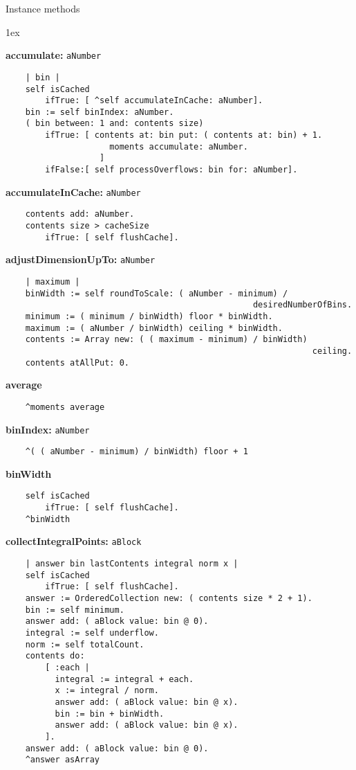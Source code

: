 Instance methods
{\parskip 1ex\par\noindent}
{\bf accumulate:} {\tt aNumber}
\begin{verbatim}
    | bin |
    self isCached
        ifTrue: [ ^self accumulateInCache: aNumber].
    bin := self binIndex: aNumber.
    ( bin between: 1 and: contents size)
        ifTrue: [ contents at: bin put: ( contents at: bin) + 1.
                     moments accumulate: aNumber.
                   ]
        ifFalse:[ self processOverflows: bin for: aNumber].

\end{verbatim}
{\bf accumulateInCache:} {\tt aNumber}
\begin{verbatim}
    contents add: aNumber.
    contents size > cacheSize
        ifTrue: [ self flushCache].

\end{verbatim}
{\bf adjustDimensionUpTo:} {\tt aNumber}
\begin{verbatim}
    | maximum |
    binWidth := self roundToScale: ( aNumber - minimum) / 
                                                  desiredNumberOfBins.
    minimum := ( minimum / binWidth) floor * binWidth.
    maximum := ( aNumber / binWidth) ceiling * binWidth.
    contents := Array new: ( ( maximum - minimum) / binWidth) 
                                                              ceiling.
    contents atAllPut: 0.

\end{verbatim}
{\bf average}
\begin{verbatim}
    ^moments average

\end{verbatim}
{\bf binIndex:} {\tt aNumber}
\begin{verbatim}
    ^( ( aNumber - minimum) / binWidth) floor + 1

\end{verbatim}
{\bf binWidth}
\begin{verbatim}
    self isCached
        ifTrue: [ self flushCache].
    ^binWidth

\end{verbatim}
{\bf collectIntegralPoints:} {\tt aBlock}
\begin{verbatim}
    | answer bin lastContents integral norm x |
    self isCached
        ifTrue: [ self flushCache].
    answer := OrderedCollection new: ( contents size * 2 + 1).
    bin := self minimum.
    answer add: ( aBlock value: bin @ 0).
    integral := self underflow.
    norm := self totalCount.
    contents do:
        [ :each |
          integral := integral + each.
          x := integral / norm.
          answer add: ( aBlock value: bin @ x).
          bin := bin + binWidth.
          answer add: ( aBlock value: bin @ x).
        ].
    answer add: ( aBlock value: bin @ 0).
    ^answer asArray

\end{verbatim}
